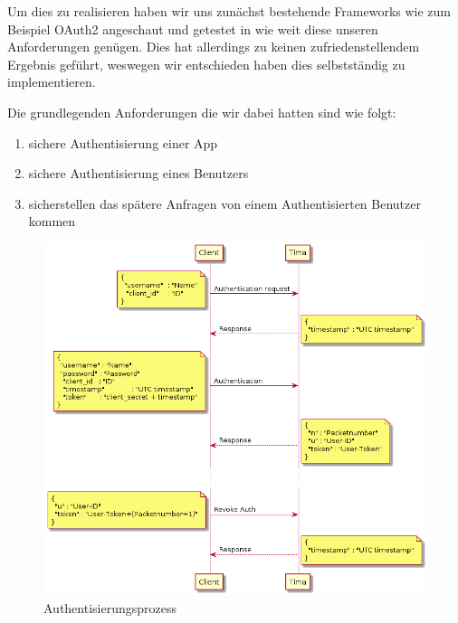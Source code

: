 Um dies zu realisieren haben wir uns zunächst bestehende Frameworks wie zum Beispiel OAuth2 angeschaut und getestet in wie weit diese unseren Anforderungen genügen. Dies hat allerdings zu keinen zufriedenstellendem Ergebnis geführt, weswegen wir entschieden haben dies selbstständig zu implementieren.

Die grundlegenden Anforderungen die wir dabei hatten sind wie folgt:
\begin{enumerate}
	\item sichere Authentisierung einer App
	\item sichere Authentisierung eines Benutzers
	\item sicherstellen das spätere Anfragen von einem Authentisierten Benutzer kommen
\end{enumerate}

\begin{figure}[!h]
	\centering
	\includegraphics[width=\textwidth]{images/auth.png}
	\caption{Authentisierungsprozess}
	\label{fig:auth}
\end{figure}

